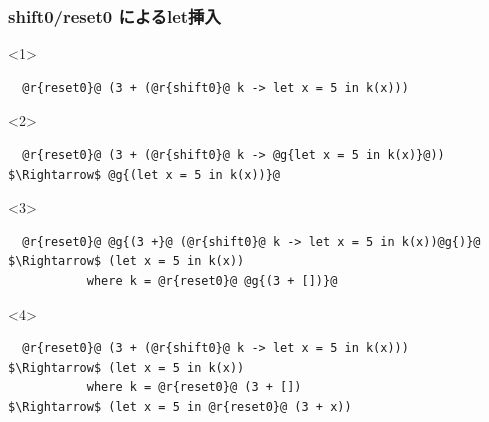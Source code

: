 \documentclass[dvipdfmx,cjk,xcolor=dvipsnames,envcountsect,notheorems,12pt]{beamer}
\theoremstyle{definition}
\begin{document}
\begin{frame}[fragile]
  \frametitle{shift0/reset0 によるlet挿入}

  \begin{onlyenv}<1>
\begin{lstlisting}
  @r{reset0}@ (3 + (@r{shift0}@ k -> let x = 5 in k(x)))
\end{lstlisting}
  \end{onlyenv}

  \begin{onlyenv}<2>
\begin{lstlisting}
  @r{reset0}@ (3 + (@r{shift0}@ k -> @g{let x = 5 in k(x)}@))
$\Rightarrow$ @g{(let x = 5 in k(x))}@
\end{lstlisting}
  \end{onlyenv}

  \begin{onlyenv}<3>
\begin{lstlisting}
  @r{reset0}@ @g{(3 +}@ (@r{shift0}@ k -> let x = 5 in k(x))@g{)}@
$\Rightarrow$ (let x = 5 in k(x))
           where k = @r{reset0}@ @g{(3 + [])}@

\end{lstlisting}
  \end{onlyenv}

  \begin{onlyenv}<4>
\begin{lstlisting}
  @r{reset0}@ (3 + (@r{shift0}@ k -> let x = 5 in k(x)))
$\Rightarrow$ (let x = 5 in k(x))
           where k = @r{reset0}@ (3 + [])
$\Rightarrow$ (let x = 5 in @r{reset0}@ (3 + x))
\end{lstlisting}
  \end{onlyenv}


\end{frame}
\end{document}
